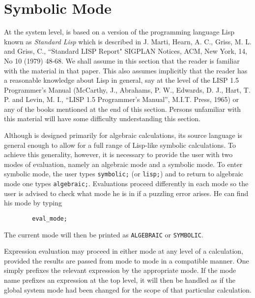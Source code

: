 \chapter{Symbolic Mode}

\hypertarget{target:modes}{}
\hypertarget{reserved:LISP}{}

At the system level, {\REDUCE} is based on a version of the programming
language Lisp known as \emph{Standard Lisp} which is described
in J. Marti, Hearn, A. C., Griss, M. L. and Griss, C., ``Standard LISP
Report" SIGPLAN Notices, ACM, New York, 14, No 10 (1979) 48-68.  We shall
assume in this section that the reader is familiar with the material in
that paper.  This also assumes implicitly that the reader has a reasonable
knowledge about Lisp in general, say at the level of the LISP 1.5
Programmer's Manual (McCarthy, J., Abrahams, P. W., Edwards, D. J., Hart,
T. P. and Levin, M. I., ``LISP 1.5 Programmer's Manual'', M.I.T.  Press,
1965) or any of the books mentioned at the end of this section.  Persons
unfamiliar with this material will have some difficulty understanding this
section.

Although {\REDUCE} is designed primarily for algebraic calculations, its
source language is general enough to allow for a full range of Lisp-like
symbolic calculations.  To achieve this generality, however, it is
necessary to provide the user with two modes of evaluation, namely an
algebraic mode and a symbolic mode. To enter symbolic mode, the user types \texttt{symbolic;}
 (or \texttt{lisp;}) and to return to
algebraic mode one types \texttt{algebraic;}.
Evaluations proceed differently in each mode so the user is advised to
check what mode he is in if a puzzling error arises.  He can find his mode
by typing
\begin{verbatim}
        eval_mode;
\end{verbatim}
The current mode will then be printed as \texttt{ALGEBRAIC} or \texttt{SYMBOLIC}.

Expression evaluation may proceed in either mode at any level of a
calculation, provided the results are passed from mode to mode in a
compatible manner. One simply prefixes the relevant expression by the
appropriate mode. If the mode name prefixes an expression at the top
level, it will then be handled as if the global system mode had been
changed for the scope of that particular calculation.

